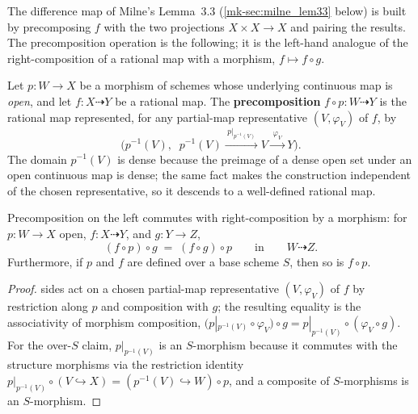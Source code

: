 The difference map of Milne's Lemma~3.3 (\ref{mk-sec:milne_lem33} below) is built by
precomposing \(f\) with the two projections \(X \times X \to X\) and pairing the results.
The precomposition operation is the following; it is the left-hand analogue of the
right-composition of a rational map with a morphism, \(f \mapsto f \circ g\).

\begin{definition}\label{mk-def:rationalMap_precomp}
  \leanok

  Let \(p \colon W \to X\) be a morphism of schemes whose underlying continuous map is
  \emph{open}, and let \(f \colon X \dashrightarrow Y\) be a rational map. The
  \textbf{precomposition} \(f \circ p \colon W \dashrightarrow Y\) is the rational map
  represented, for any partial-map representative \((V, \varphi_V)\) of \(f\), by
  \[
    \bigl(p^{-1}(V),\; \; p^{-1}(V) \xrightarrow{\;p|_{p^{-1}(V)}\;} V
    \xrightarrow{\;\varphi_V\;} Y\bigr).
  \]
  The domain \(p^{-1}(V)\) is dense because the preimage of a dense open set under an open
  continuous map is dense; the same fact makes the construction independent of the chosen
  representative, so it descends to a well-defined rational map.
\end{definition}

\begin{lemma}\label{mk-lem:rationalMap_precomp_compHom}
  \leanok

  Precomposition on the left commutes with right-composition by a morphism: for
  \(p \colon W \to X\) open, \(f \colon X \dashrightarrow Y\), and \(g \colon Y \to Z\),
  \[
    (f \circ p) \circ g \;=\; (f \circ g) \circ p
    \qquad\text{in}\qquad W \dashrightarrow Z .
  \]
  Furthermore, if \(p\) and \(f\) are defined over a base scheme \(S\), then so is
  \(f \circ p\).
\end{lemma}
\begin{proof}
  \leanokBoth sides act on a chosen partial-map representative \((V, \varphi_V)\) of \(f\) by
  restriction along \(p\) and composition with \(g\); the resulting equality is the
  associativity of morphism composition,
  \((p|_{p^{-1}(V)} \circ \varphi_V) \circ g = p|_{p^{-1}(V)} \circ (\varphi_V \circ g)\).
  For the over-\(S\) claim, \(p|_{p^{-1}(V)}\) is an \(S\)-morphism because it commutes with
  the structure morphisms via the restriction identity
  \(p|_{p^{-1}(V)} \circ (V \hookrightarrow X) = (p^{-1}(V) \hookrightarrow W) \circ p\),
  and a composite of \(S\)-morphisms is an \(S\)-morphism.
\end{proof}

